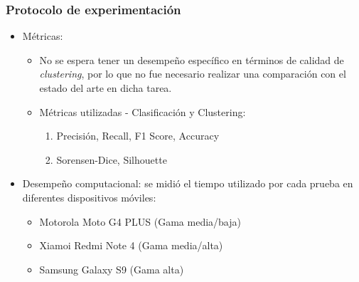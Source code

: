 \begin{frame}[t,fragile]
\frametitle {Protocolo de experimentación}
\begin{itemize}
	\item Métricas:
	\begin{itemize}
		\item No se espera tener un desempeño específico en términos de calidad de \textit{clustering}, por lo que no fue necesario realizar una comparación con el estado del arte en dicha tarea.
		\vspace{2mm}
		\item Métricas utilizadas - \color{darkgreen} Clasificación \color{black}y \color{blue} Clustering:
		\vspace{2mm}
		\begin{enumerate}
			\item \color{darkgreen} Precisión, Recall, F1 Score, Accuracy
			\item \color{blue} Sorensen-Dice, Silhouette 
		\end{enumerate}
	\end{itemize}
	\vspace{3mm}
	\item Desempeño computacional: se midió el tiempo utilizado por cada prueba en diferentes dispositivos móviles:
	\begin{itemize}
		\item Motorola Moto G4 PLUS (Gama media/baja)
		\vspace{2mm}
		\item Xiamoi Redmi Note 4 (Gama media/alta)
		\vspace{2mm}
		\item Samsung Galaxy S9 (Gama alta)
	\end{itemize}
\end{itemize}
\end{frame}
